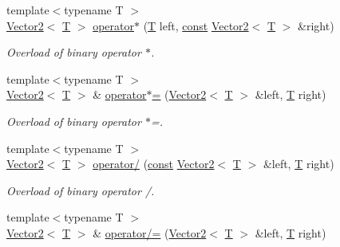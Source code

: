 \begin{DoxyCompactItemize}
{\footnotesize template$<$typename T $>$ }\\\hyperlink{classsf_1_1_vector2}{Vector2}$<$ \hyperlink{curses_8priv_8h_a5ef253115820acf7d27f3c5c3b02a0f0}{T} $>$ \hyperlink{classsf_1_1_vector2_ad8b3e1cf7b156a984bc1427539ca8605}{operator$\ast$} (\hyperlink{curses_8priv_8h_a5ef253115820acf7d27f3c5c3b02a0f0}{T} left, \hyperlink{term__entry_8h_a57bd63ce7f9a353488880e3de6692d5a}{const} \hyperlink{classsf_1_1_vector2}{Vector2}$<$ \hyperlink{curses_8priv_8h_a5ef253115820acf7d27f3c5c3b02a0f0}{T} $>$ \&right)
\begin{DoxyCompactList}\small\item\em Overload of binary operator $\ast$. \end{DoxyCompactList}\item 
{\footnotesize template$<$typename T $>$ }\\\hyperlink{classsf_1_1_vector2}{Vector2}$<$ \hyperlink{curses_8priv_8h_a5ef253115820acf7d27f3c5c3b02a0f0}{T} $>$ \& \hyperlink{classsf_1_1_vector2_abea24cb28c0d6e2957e259ba4e65d70e}{operator$\ast$=} (\hyperlink{classsf_1_1_vector2}{Vector2}$<$ \hyperlink{curses_8priv_8h_a5ef253115820acf7d27f3c5c3b02a0f0}{T} $>$ \&left, \hyperlink{curses_8priv_8h_a5ef253115820acf7d27f3c5c3b02a0f0}{T} right)
\begin{DoxyCompactList}\small\item\em Overload of binary operator $\ast$=. \end{DoxyCompactList}\item 
{\footnotesize template$<$typename T $>$ }\\\hyperlink{classsf_1_1_vector2}{Vector2}$<$ \hyperlink{curses_8priv_8h_a5ef253115820acf7d27f3c5c3b02a0f0}{T} $>$ \hyperlink{classsf_1_1_vector2_a7409dd89cb3aad6c3bc6622311107311}{operator/} (\hyperlink{term__entry_8h_a57bd63ce7f9a353488880e3de6692d5a}{const} \hyperlink{classsf_1_1_vector2}{Vector2}$<$ \hyperlink{curses_8priv_8h_a5ef253115820acf7d27f3c5c3b02a0f0}{T} $>$ \&left, \hyperlink{curses_8priv_8h_a5ef253115820acf7d27f3c5c3b02a0f0}{T} right)
\begin{DoxyCompactList}\small\item\em Overload of binary operator /. \end{DoxyCompactList}\item 
{\footnotesize template$<$typename T $>$ }\\\hyperlink{classsf_1_1_vector2}{Vector2}$<$ \hyperlink{curses_8priv_8h_a5ef253115820acf7d27f3c5c3b02a0f0}{T} $>$ \& \hyperlink{classsf_1_1_vector2_ac4d293c9dc7954ccfd5e373972f38b03}{operator/=} (\hyperlink{classsf_1_1_vector2}{Vector2}$<$ \hyperlink{curses_8priv_8h_a5ef253115820acf7d27f3c5c3b02a0f0}{T} $>$ \&left, \hyperlink{curses_8priv_8h_a5ef253115820acf7d27f3c5c3b02a0f0}{T} right)

\end{DoxyCompactItemize}

